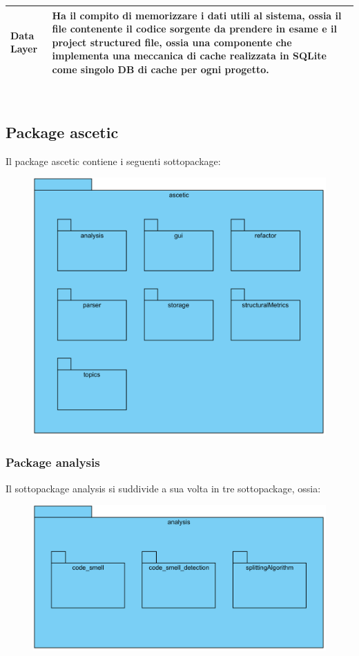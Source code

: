 \documentclass[11pt]{article}
\begin{document}
		\begin{tabular}{|p{3cm}|p{}|}
			\hline
			\textbf{Data Layer} & Ha il compito di memorizzare i dati utili al sistema, ossia il file contenente il codice sorgente da prendere in esame e il project structured file, ossia una componente che implementa una meccanica di cache realizzata in SQLite come singolo DB di cache per ogni progetto. \\
			\hline
		\end{tabular}\\
\newpage		
		\subsection{Package ascetic}
			Il package ascetic contiene i seguenti sottopackage:
			\begin{figure}[!h]
				\centering
				\includegraphics{diagrams/AsceticPackageDiagram}
			\end{figure}
			
			\subsubsection{Package analysis}
			Il sottopackage analysis si suddivide a sua volta in tre sottopackage, ossia: 
			\begin{figure}[!h]
				\centering
				\includegraphics[width=12cm]{diagrams/AnalysisPackageDiagram}
			\end{figure}
						
\end{document}
